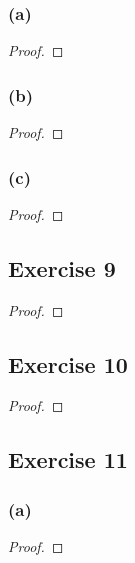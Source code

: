 \documentclass[14pt]{extarticle}
\begin{document}
\subsubsection{(a)}

\begin{proof}

\end{proof}

\subsubsection{(b)}

\begin{proof}

\end{proof}

\subsubsection{(c)}

\begin{proof}

\end{proof}

\subsection{Exercise 9}

\begin{proof}

\end{proof}

\subsection{Exercise 10}

\begin{proof}

\end{proof}

\subsection{Exercise 11}

\subsubsection{(a)}

\begin{proof}

\end{proof}
\end{document}
